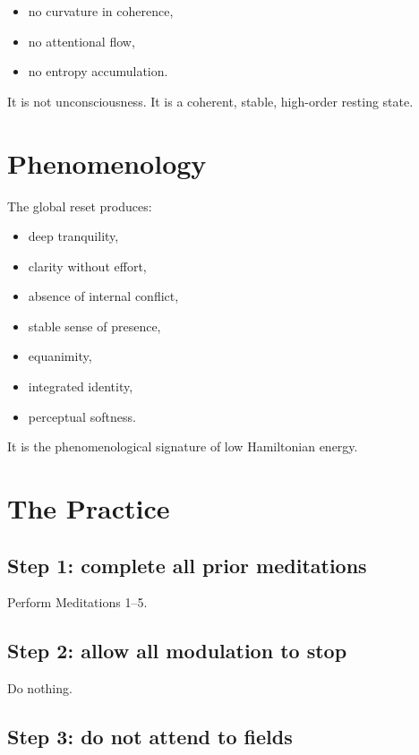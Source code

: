 \documentclass[12pt]{article}
\begin{document}
\begin{itemize}
    \item no curvature in coherence,
    \item no attentional flow,
    \item no entropy accumulation.
\end{itemize}

It is not unconsciousness.  
It is a coherent, stable, high-order resting state.

\section{Phenomenology}

The global reset produces:

\begin{itemize}
    \item deep tranquility,
    \item clarity without effort,
    \item absence of internal conflict,
    \item stable sense of presence,
    \item equanimity,
    \item integrated identity,
    \item perceptual softness.
\end{itemize}

It is the phenomenological signature of low Hamiltonian energy.

\section{The Practice}

\subsection*{Step 1: complete all prior meditations}

Perform Meditations 1–5.

\subsection*{Step 2: allow all modulation to stop}

Do nothing.

\subsection*{Step 3: do not attend to fields}
\end{document}
